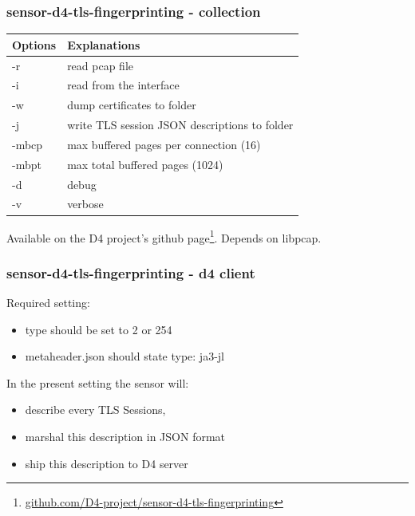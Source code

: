 \documentclass{beamer}
\begin{document}
\begin{frame}
        \frametitle{sensor-d4-tls-fingerprinting - collection}

  


\begin{tabular}{l|l}
Options & Explanations\\
\hline
  -r & read pcap file\\
  -i & read from the interface \\
  -w & dump certificates to folder\\
  -j & write TLS session JSON descriptions to folder\\
  -mbcp & max buffered pages per connection (16) \\
  -mbpt & max total buffered pages (1024) \\
  -d & debug \\
  -v & verbose
\end{tabular}

\vspace{.8cm}
Available on the D4 project's github page\footnote{\url{github.com/D4-project/sensor-d4-tls-fingerprinting}}.
Depends on libpcap.

\end{frame}


\begin{frame}[fragile]
        \frametitle{sensor-d4-tls-fingerprinting - d4 client} 
        Required setting:
        \begin{itemize}
        \item type should be set to 2 or 254
          \item metaheader.json should state type: ja3-jl
        \end{itemize}
        
        \vspace{.5cm}
        
        In the present setting the sensor will:
        \begin{itemize}
          \item describe every TLS Sessions,
          \item marshal this description in JSON format
          \item ship this description to D4 server
        \end{itemize}
\end{frame}
\end{document}
